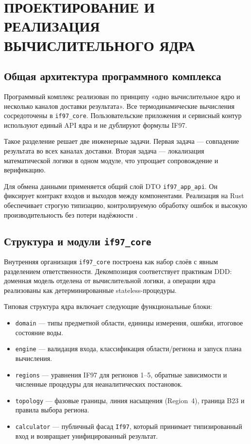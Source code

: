 \chapter{ПРОЕКТИРОВАНИЕ И РЕАЛИЗАЦИЯ ВЫЧИСЛИТЕЛЬНОГО ЯДРА}

\section{Общая архитектура программного комплекса}

Программный комплекс реализован по принципу
«одно вычислительное ядро и несколько каналов доставки результата».
Все термодинамические вычисления сосредоточены в \texttt{if97\_core}.
Пользовательские приложения и сервисный контур
используют единый API ядра и не дублируют формулы IF97.

Такое разделение решает две инженерные задачи.
Первая задача --- совпадение результата во всех каналах доставки.
Вторая задача --- локализация математической логики в одном модуле,
что упрощает сопровождение и верификацию.

Для обмена данными применяется общий слой DTO \texttt{if97\_app\_api}.
Он фиксирует контракт входов и выходов между компонентами.
Реализация на Rust обеспечивает строгую типизацию,
контролируемую обработку ошибок и высокую производительность
без потери надёжности \cite{rust_book}.

\section{Структура и модули \texttt{if97\_core}}

Внутренняя организация \texttt{if97\_core}
построена как набор слоёв с явным разделением ответственности.
Декомпозиция соответствует практикам DDD:
доменная модель отделена от вычислительной логики,
а операции ядра реализованы как детерминированные stateless-процедуры.

Типовая структура ядра включает следующие функциональные блоки:
\begin{itemize}
\item \texttt{domain} --- типы предметной области, единицы измерения, ошибки, итоговое состояние воды.  
\item \texttt{engine} --- валидация входа, классификация области/региона и запуск плана вычисления.  
\item \texttt{regions} --- уравнения IF97 для регионов 1--5, обратные зависимости и численные процедуры для неаналитических постановок.  
\item \texttt{topology} --- фазовые границы, линия насыщения (Region~4), граница B23 и правила выбора региона.  
\item \texttt{calculator} --- публичный фасад \texttt{If97}, который принимает типизированный вход и возвращает унифицированный результат.  
\end{itemize}

